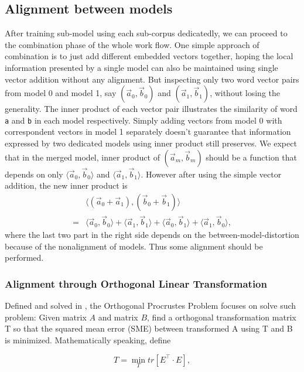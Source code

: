 \subsection{Alignment between models}
  After training sub-model using each sub-corpus dedicatedly, we can proceed to the combination phase of the whole work flow. One simple approach of combination is to just add different embedded vectors together, hoping the local information presented by a single model can also be maintained using single vector addition without any alignment. But inspecting only two word vector pairs from model 0 and model 1, say $(\vec{a}_0, \vec{b}_0)$ and $(\vec{a}_1, \vec{b}_1)$, without losing the generality. The inner product of each vector pair illustrates the similarity of word \verb|a| and \verb|b| in each model respectively. Simply adding vectors from model 0 with correspondent vectors in model 1 separately doesn't guarantee that information expressed by two dedicated models using inner product still preserves. We expect that in the merged model, inner product of $(\vec{a}_m,\vec{b}_m)$ should be a function that depends on only $\langle\vec{a}_0,\vec{b}_0\rangle$ and $\langle\vec{a}_1, \vec{b}_1\rangle$. However after using the simple vector addition, the new inner product is
  \begin{equation}\label{eq:inner_product}\begin{split}
   &\langle(\vec{a}_0+\vec{a}_1), (\vec{b}_0+\vec{b}_1)\rangle\\
   = &\langle\vec{a}_0,\vec{b}_0\rangle+
     \langle\vec{a}_1,\vec{b}_1\rangle+
     \langle\vec{a}_0,\vec{b}_1\rangle+
     \langle\vec{a}_1,\vec{b}_0\rangle,
  \end{split}\end{equation}
  where the last two part in the right side depends on the between-model-distortion because of the nonalignment of models. Thus some alignment should be performed.

  \subsubsection{Alignment through Orthogonal Linear Transformation}
  Defined and solved in \cite{schonemann1966generalized}, the Orthogonal Procrustes Problem focuses on solve such problem: Given matrix $A$ and matrix $B$, find a orthogonal transformation matrix T so that the squared mean error (SME) between transformed A using T and B is minimized. Mathematically speaking, define
  
  \begin{equation}
    T = \min_{T}tr[E^\intercal \cdot E],
  \end{equation}
  
